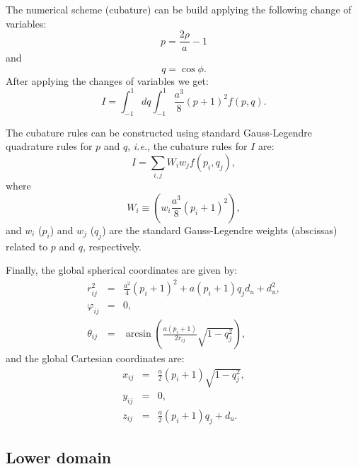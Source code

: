 \documentclass[11pt]{amsart}
\begin{document}
The numerical scheme (cubature) can be build applying the following change of variables:
\begin{equation}
	p=\frac{2\rho}{a}-1
\end{equation}
and
\begin{equation}
	q=\cos\phi.
\end{equation}
After applying the changes of variables we get:
\begin{equation}
	I=\int_{-1}^1dq\int_{-1}^1\frac{a^3}{8}(p+1)^2f(p,q).
\end{equation}

The cubature rules can be constructed using standard Gauss-Legendre quadrature rules for
$p$ and $q$, \textit{i.e.}, the cubature rules for $I$ are:
%
\begin{equation}
	I=\sum_{i,j}W_iw_jf(p_i,q_j),
\end{equation}
%
where
%
\begin{equation}
	W_i\equiv\left(w_i\frac{a^3}{8}(p_i+1)^2\right),
\end{equation}
%
and $w_i$ ($p_i$) and $w_j$ ($q_j$) are the standard Gauss-Legendre weights (abscissas) related to
$p$ and $q$, respectively.

Finally, the global spherical coordinates are given by:
%
\begin{subequations}
\begin{eqnarray}
	r^2_{ij} & = & \frac{a^2}{4}(p_i+1)^2+a(p_i+1)q_jd_u+d_u^2,\\
	\varphi_{ij} & = & 0,\\
	\theta_{ij} & = & \arcsin\left(\frac{a(p_i+1)}{2r_{ij}}\sqrt{1-q_j^2}\right),
\end{eqnarray}
\end{subequations}
%
and the global Cartesian coordinates are:
%
\begin{subequations}
\begin{eqnarray}
	x_{ij} & = & \frac{a}{2}(p_i+1)\sqrt{1-q_j^2},\\
	y_{ij} & = & 0,\\
	z_{ij} & = & \frac{a}{2}(p_i+1)q_j+d_u.
\end{eqnarray}
%
\end{subequations}

\subsection{Lower domain}
\end{document}
